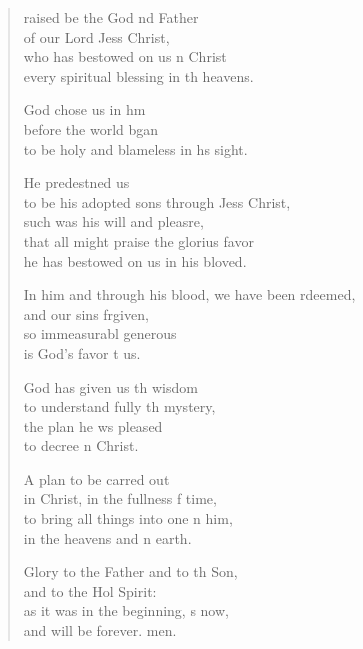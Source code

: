 \settowidth{\versewidth}{In him and through his blood, we have been redeemed, *}
\begin{verse}%
  \begin{patverse}
raised be the God nd Father\Med\\
of our Lord Jess Christ,\\
who has bestowed on us n Christ\Med\\
every spiritual blessing in th heavens.

God chose us in h\pointup{\i}m\Flex\\
before the world bgan\Med\\
to be holy and blameless in h\pointup{\i}s sight.

He predestned us\Med\\
to be his adopted sons through Jess Christ,\\
such was his will and pleasre,\Flex\\
that all might praise the glorius favor\Med\\
he has bestowed on us in his bloved.

In him and through his blood, we have been rdeemed,\Med\\
and our sins frgiven,\\
so immeasurabl generous\Med\\
is God’s favor t us.

God has given us th wisdom\Med\\
to understand fully th mystery,\\
the plan he ws pleased\Med\\
to decree \pointup{\i}n Christ.

A plan to be carred out\Med\\
in Christ, in the fullness f time,\\
to bring all things into one n him,\Med\\
in the heavens and n earth.

Glory to the Father and to th Son,\Med\\
and to the Hol Spirit:\\
as it was in the beginning, s now,\Med\\
and will be forever. men.
  \end{patverse}
\end{verse}
